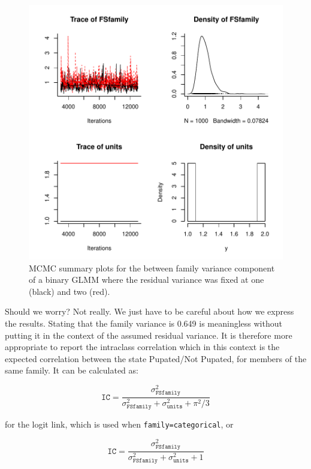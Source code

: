\documentclass{article}
\begin{document}
\begin{figure}[!h]
\begin{center}
\includegraphics{Lecture2-068}
\end{center}
\caption{MCMC summary plots for the between family variance component of a binary GLMM where the residual variance was fixed at one (black) and two (red).}
\label{Bin2-fig}
\end{figure}

Should we worry? Not really. We just have to be careful about how we express the results. Stating that the family variance is 0.649 is meaningless without putting it in the context of the assumed residual variance. It is therefore more appropriate to report the intraclass correlation which in this context is the expected correlation between the state Pupated/Not Pupated, for members of the same family. It can be calculated as:

\begin{equation}
\texttt{IC} =  \frac{\sigma^{2}_{\texttt{FSfamily}}}{\sigma^{2}_{\texttt{FSfamily}}+\sigma^{2}_{\texttt{units}}+\pi^{2}/3} 
\end{equation} 

for the logit link, which is used when \texttt{family=categorical}, or 

\begin{equation}
\texttt{IC} =  \frac{\sigma^{2}_{\texttt{FSfamily}}}{\sigma^{2}_{\texttt{FSfamily}}+\sigma^{2}_{\texttt{units}}+1} 
\end{equation} 
\end{document}
